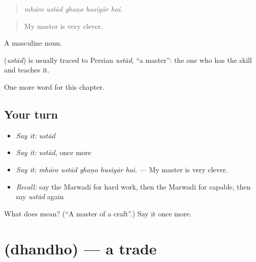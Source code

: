 \begin{quote}
    
\end{quote}

\begin{quote}
\emph{mhāro ustād ghaṇo husiyār hai.}
\end{quote}

\begin{quote}
My master is very clever.
\end{quote}

A masculine noun.

\begin{cousinweb}
\textbf{} (\emph{ustād}) is usually traced to Persian \emph{ustād}, \textquotedblleft{}a master\textquotedblright{}: the one who has the skill and teaches it.
\end{cousinweb}

\begin{grammarlens}[title={What you've built}]
One more word for this chapter.
\end{grammarlens}

\subsection*{Your turn}
\begin{itemize}
\raggedright
  \item \emph{Say it:} \emph{ustād}
  \item \emph{Say it:} \emph{ustād}, once more
  \item \emph{Say it:} \emph{mhāro ustād ghaṇo husiyār hai.} — My master is very clever.
  \item \emph{Recall:} say the Marwadi for hard work, then the Marwadi for capable, then say \emph{ustād} again
\end{itemize}

\begin{tcolorbox}[breakable,colback=teal!4,colframe=teal!35!black,title={Before you move on}]
What does  mean? (\textquotedblleft{}A master of a craft\textquotedblright{}.) Say it once more.
\end{tcolorbox}
\section[\texorpdfstring{\mw{धंधो} (dhandho)}{धंधो (dhandho)}]{ (dhandho) — a trade}

\label{lesson:MW-C288-dhandho}



